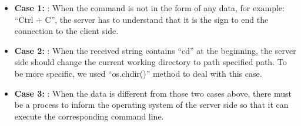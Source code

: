 \begin{itemize}
    \item \textbf{Case 1: }: \newline When the command is not in the form of any data, for example: “Ctrl + C”, the server has to understand that it is the sign to end the connection to the client side. 
    \item \textbf{Case 2: }: \newline When the received string contains “cd” at the beginning, the server side should change the current working directory to path specified path. To be more specific, we used “os.chdir()” method to deal with this case. 
    \item \textbf{Case 3: }: \newline When the data is different from those two cases above, there must be a process to inform the operating system of the server side so that it can execute the corresponding command line.
\end{itemize}